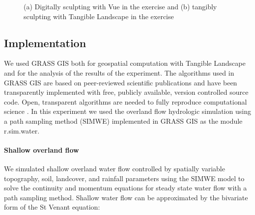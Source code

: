 \documentclass{isprs}
\begin{document}
\begin{figure}
\begin{center}
\hspace{1em}%
\caption{(a) Digitally sculpting with Vue in the  exercise and (b) tangibly sculpting with Tangible Landscape in the  exercise}
\label{fig:exercises}
\end{center}
\end{figure}

\subsection{Implementation}
We used GRASS GIS both
for geospatial computation with Tangible Landscape
and for the analysis of the results of the experiment.
The algorithms used in GRASS GIS are 
based on peer-reviewed scientific publications 
and have been 
transparently implemented 
with free, publicly available, version controlled source code. 
Open, transparent algorithms are needed to fully reproduce computational science \cite{Rocchini2012}. 
In this experiment we used
the overland flow hydrologic simulation using a path sampling method (SIMWE) 
implemented in GRASS GIS as the module r.sim.water.

\paragraph{Shallow overland flow}
We simulated shallow overland water flow controlled by spatially variable topography, soil, landcover, and rainfall parameters using the SIMWE model to solve the continuity and momentum equations for steady state water flow with a path sampling method. 
%
Shallow water flow can be approximated by
the bivariate form of the St Venant equation:
\end{document}
